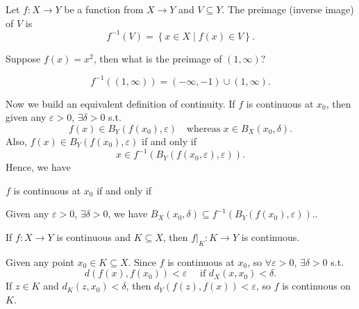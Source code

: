 \begin{definition}[Preimage] \label{def: preimage}
    Let \(f : X \to Y\) be a function from \(X \to Y\) and \(V \subseteq Y\). The preimage (inverse image) of \(V\) is 
    \[
        f^{-1}(V) = \left\{ x\in X \mid f(x) \in V \right\}.
    \]    
\end{definition}

\begin{eg}
    Suppose \(f(x) = x^2\), then what is the preimage of \((1, \infty )\)?  
\end{eg}
\begin{explanation}
    \[
        f^{-1}((1, \infty )) = (-\infty , -1) \cup (1, \infty ).
    \]
\end{explanation}
Now we build an equivalent definition of continuity. If \(f\) is continuous at \(x_0\), then given any \(\varepsilon > 0\), \(\exists \delta > 0\) s.t. 
\[
    f(x) \in B_Y(f(x_0), \varepsilon ) \quad \text{whereas } x \in B_X(x_0, \delta ).
\]  Also, \(f(x) \in B_Y(f(x_0), \varepsilon )\) if and only if
\[
    x \in f^{-1}(B_Y(f(x_0, \varepsilon ), \varepsilon )).
\] Hence, we have 
\begin{corollary}
    \(f\) is continuous at \(x_0\) if and only if 
    \begin{center}
        Given any \(\varepsilon > 0\), \(\exists \delta > 0\), we have \(B_X(x_0, \delta ) \subseteq f^{-1}(B_Y(f(x_0), \varepsilon )).\).   
    \end{center}  
\end{corollary}

\begin{remark} \label{rmk: if f conti then f intersect K conti}
    If \(f: X \to Y\) is continuous and \(K \subseteq X\), then \(f\vert_K : K \to Y\) is continuous.   
\end{remark}
\begin{explanation}
    Given any point \(x_0 \in K \subseteq X\). Since \(f\) is continuous at \(x_0\), so \(\forall \varepsilon > 0\), \(\exists \delta > 0\) s.t. 
    \[
        d\left( f(x), f(x_0) \right) < \varepsilon \quad \text{ if } d_X(x, x_0) < \delta. 
    \]     
    If \(z \in K\) and \(d_K(z, x_0) < \delta \), then \(d_Y(f(z), f(x)) <\varepsilon \), so \(f\) is continuous on \(K\).     
\end{explanation}

